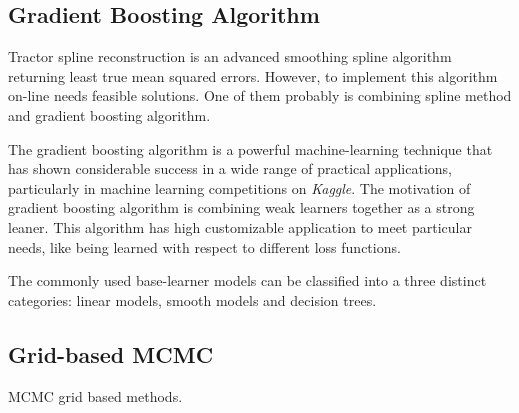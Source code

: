 

\subsection*{Gradient Boosting Algorithm}

Tractor spline reconstruction is an advanced smoothing spline algorithm returning least true mean squared errors. However, to implement this algorithm on-line needs feasible solutions. One of them probably is combining spline method and gradient boosting algorithm. 

The gradient boosting algorithm is a powerful machine-learning technique that has shown considerable success in a wide range of practical applications, particularly in machine learning competitions on \textit{Kaggle}. The motivation of gradient boosting algorithm is combining weak learners together as a strong leaner. This algorithm has high customizable application to meet particular needs, like being learned with respect to different loss functions. 

The commonly used base-learner models can be classified into a three distinct categories: linear models, smooth models and decision trees. 


\subsection*{Grid-based MCMC}

MCMC grid based methods. 


